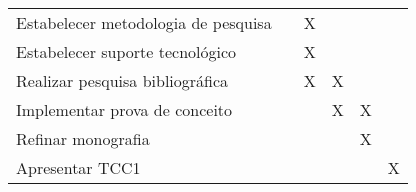 \begin{table}[h]
{\begin{tabular}{ l l l l l l }
    \multicolumn{1}{p{4.750cm}|}{Estabelecer metodologia de pesquisa \centering } &
    \multicolumn{1}{p{1.383cm}|}{  \centering } &
    \multicolumn{1}{p{1.383cm}|}{X \centering } &
    \multicolumn{1}{p{1.400cm}|}{  \centering } &
    \multicolumn{1}{p{1.417cm}|}{  \centering } &
    \multicolumn{1}{p{1.400cm}}{  \centering }
  \\  
    \multicolumn{1}{p{4.750cm}|}{Estabelecer suporte tecnológico \centering } &
    \multicolumn{1}{p{1.383cm}|}{  \centering } &
    \multicolumn{1}{p{1.383cm}|}{X \centering } &
    \multicolumn{1}{p{1.400cm}|}{  \centering } &
    \multicolumn{1}{p{1.417cm}|}{  \centering } &
    \multicolumn{1}{p{1.400cm}}{  \centering }
  \\  
    \multicolumn{1}{p{4.750cm}|}{Realizar pesquisa bibliográfica \centering } &
    \multicolumn{1}{p{1.383cm}|}{  \centering } &
    \multicolumn{1}{p{1.383cm}|}{X \centering } &
    \multicolumn{1}{p{1.400cm}|}{X \centering } &
    \multicolumn{1}{p{1.417cm}|}{  \centering } &
    \multicolumn{1}{p{1.400cm}}{  \centering }
  \\  
    \multicolumn{1}{p{4.750cm}|}{Implementar prova de conceito \centering } &
    \multicolumn{1}{p{1.383cm}|}{  \centering } &
    \multicolumn{1}{p{1.383cm}|}{  \centering } &
    \multicolumn{1}{p{1.400cm}|}{X \centering } &
    \multicolumn{1}{p{1.417cm}|}{X \centering } &
    \multicolumn{1}{p{1.400cm}}{  \centering }
  \\  
    \multicolumn{1}{p{4.750cm}|}{Refinar monografia \centering } &
    \multicolumn{1}{p{1.383cm}|}{  \centering } &
    \multicolumn{1}{p{1.383cm}|}{  \centering } &
    \multicolumn{1}{p{1.400cm}|}{  \centering } &
    \multicolumn{1}{p{1.417cm}|}{X \centering } &
    \multicolumn{1}{p{1.400cm}}{  \centering }
  \\  
    \multicolumn{1}{p{4.750cm}|}{Apresentar TCC1 \centering } &
    \multicolumn{1}{p{1.383cm}|}{  \centering } &
    \multicolumn{1}{p{1.383cm}|}{  \centering } &
    \multicolumn{1}{p{1.400cm}|}{  \centering } &
    \multicolumn{1}{p{1.417cm}|}{  \centering } &
    \multicolumn{1}{p{1.400cm}}{X \centering }
  \\  
  \hline

 \end{tabular} }
\end{table}

